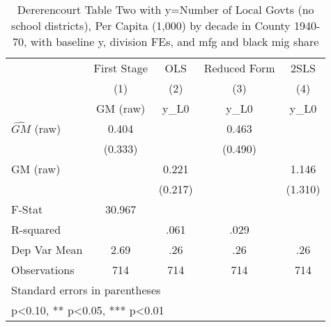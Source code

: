 \begin{table}[htbp]\centering
\def\sym#1{\ifmmode^{#1}\else\(^{#1}\)\fi}
\caption{Dererencourt Table Two with y=Number of Local Govts (no school districts), Per Capita (1,000) by decade in County 1940-70, with baseline y, division FEs, and mfg and black mig share}
\begin{tabular}{l*{4}{c}}
\toprule
                    & First Stage   &         OLS   &Reduced Form   &        2SLS   \\
                    &\multicolumn{1}{c}{(1)}&\multicolumn{1}{c}{(2)}&\multicolumn{1}{c}{(3)}&\multicolumn{1}{c}{(4)}\\
                    &\multicolumn{1}{c}{GM  (raw)}&\multicolumn{1}{c}{y\_L0}&\multicolumn{1}{c}{y\_L0}&\multicolumn{1}{c}{y\_L0}\\
\midrule
$\hat{GM}$ (raw)    &       0.404   &               &       0.463   &               \\
                    &     (0.333)   &               &     (0.490)   &               \\
\addlinespace
GM  (raw)           &               &       0.221   &               &       1.146   \\
                    &               &     (0.217)   &               &     (1.310)   \\
\midrule
F-Stat              &      30.967   &               &               &               \\
R-squared           &               &        .061   &        .029   &               \\
Dep Var Mean        &        2.69   &         .26   &         .26   &         .26   \\
Observations        &         714   &         714   &         714   &         714   \\
\bottomrule
\multicolumn{5}{l}{\footnotesize Standard errors in parentheses}\\
\multicolumn{5}{l}{\footnotesize * p<0.10, ** p<0.05, *** p<0.01}\\
\end{tabular}
\end{table}
